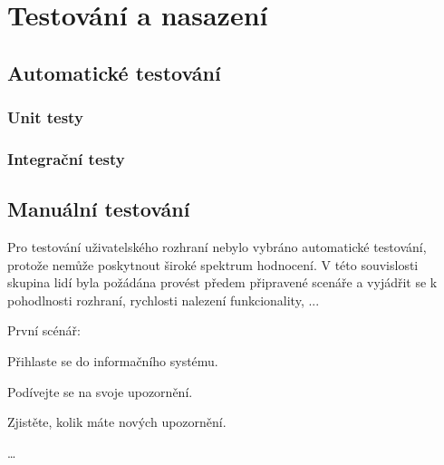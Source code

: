 \chapter{Testování a nasazení}





\section{Automatické testování}


\subsection{Unit testy}

\subsection{Integrační testy}




\section{Manuální testování}


Pro testování uživatelského rozhraní nebylo vybráno automatické testování, protože nemůže poskytnout široké spektrum hodnocení. V této souvislosti skupina lidí byla požádána provést předem připravené scenáře a vyjádřit se k pohodlnosti rozhraní, rychlosti nalezení funkcionality, ...

První scénář:
\begin{olnar}
   \item Přihlaste se do informačního systému.
   \item Podívejte se na svoje upozornění.
   \item Zjistěte, kolik máte nových upozornění.
   \item \dots
\end{olnar}

